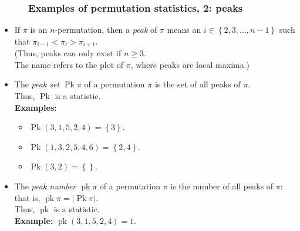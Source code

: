 \documentclass{beamer}
\newcommand{\Pk}{\operatorname{Pk}}
\newcommand{\pk}{\operatorname{pk}}
\newcommand{\fti}[1]{\frametitle{\ \ \ \ \ #1}}
\newcommand{\set}[1]{\left\{ #1 \right\}}
\newcommand{\abs}[1]{\left| #1 \right|}
\newcommand{\tup}[1]{\left( #1 \right)}
\newcommand{\defn}[1]{{\color{darkred}\emph{#1}}} %
\theoremstyle{plain}
\begin{document}
\begin{frame}
\fti{Examples of permutation statistics, 2: peaks}

\begin{itemize}

\item If $\pi$ is an $n$-permutation, then a \defn{peak} of $\pi$
      means an $i \in \set{2, 3, \ldots, n-1}$ such that
      $\pi_{i-1} < \pi_i > \pi_{i+1}$. \\
      (Thus, peaks can only exist if $n \geq 3$. \\
      The name refers to the plot of $\pi$, where peaks are
      local maxima.)

\item The \defn{peak set $\Pk \pi$} of a permutation $\pi$ is
      the set of all peaks of $\pi$. \\
      Thus, \defn{$\Pk$} is a statistic. \\
      \textbf{Examples:}
      \begin{itemize}
      \item $\Pk \tup{3, 1, 5, 2, 4} = \set{3}$.
      \item $\Pk \tup{1, 3, 2, 5, 4, 6} = \set{2, 4}$.
      \item $\Pk \tup{3, 2} = \set{}$.
      \end{itemize}

\pause

\item The \defn{peak number $\pk \pi$} of a permutation $\pi$
      is the number of all peaks of $\pi$: that is,
      $\pk \pi = \abs{\Pk \pi}$. \\
      Thus, \defn{$\pk$} is a statistic. \\
      \textbf{Example:} $\pk \tup{3, 1, 5, 2, 4} = 1$.

\end{itemize}
\vspace{10cm}
\end{frame}
\end{document}
